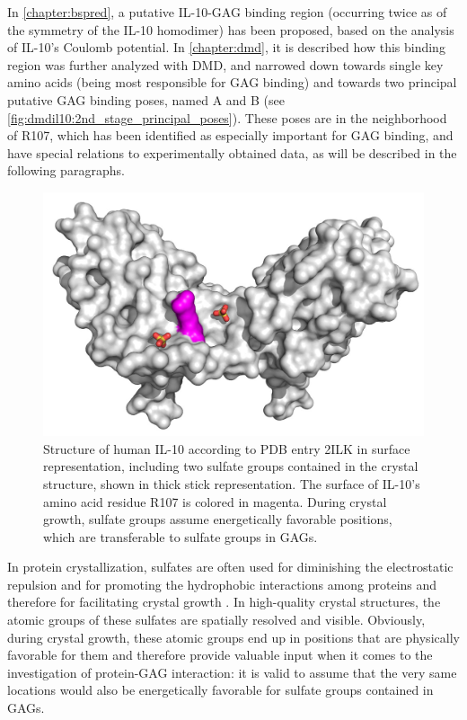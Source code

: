 In \cref{chapter:bspred}, a putative IL-10-GAG binding region (occurring twice
as of the symmetry of the IL-10 homodimer) has been proposed, based on the
analysis of IL-10's Coulomb potential. In \cref{chapter:dmd}, it is described
how this binding region was further analyzed with DMD, and narrowed down towards
single key amino acids (being most responsible for GAG binding) and towards two
principal putative GAG binding poses, named A and B (see
\cref{fig:dmdil10:2nd_stage_principal_poses}). These poses are in the
neighborhood of R107, which has been identified as especially important for GAG
binding, and have special relations to experimentally obtained data, as will be
described in the following paragraphs.

\begin{figure}
\centering
\includegraphics[width=1.0\textwidth]{gfx/together/il10sulfates_01.jpg}
\caption[]{
Structure of human IL-10 according to PDB entry 2ILK in surface representation,
including two sulfate groups contained in the crystal structure, shown in thick
stick representation. The surface of IL-10's amino acid residue R107 is colored
in magenta. During crystal growth, sulfate groups assume energetically favorable
positions, which are transferable to sulfate groups in GAGs.}
\label{fig:together:il10sulfates}
\end{figure}

In protein crystallization, sulfates are often used for diminishing the
electrostatic repulsion and for promoting the hydrophobic interactions among
proteins and therefore for facilitating crystal growth
\cite{crystal_salts_2001}. In high-quality crystal structures, the atomic groups
of these sulfates are spatially resolved and visible. Obviously, during crystal
growth, these atomic groups end up in positions that are physically favorable
for them and therefore provide valuable input when it comes to the investigation
of protein-GAG interaction: it is valid to assume that the very same locations
would also be energetically favorable for sulfate groups contained in GAGs.

